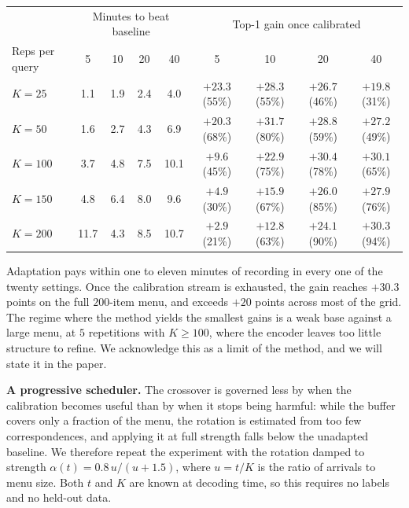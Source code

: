 \documentclass[11pt]{article}
\begin{document}
{\begin{center}
\small\setlength{\tabcolsep}{4pt}
\begin{tabular}{lcccc|cccc}
\hline
& \multicolumn{4}{c|}{Minutes to beat baseline} & \multicolumn{4}{c}{Top-1 gain once calibrated} \\
Reps per query & 5 & 10 & 20 & 40 & 5 & 10 & 20 & 40 \\
\hline
$K=25$  & 1.1 & 1.9 & 2.4 & 4.0  & $+23.3$ (55\%) & $+28.3$ (55\%) & $+26.7$ (46\%) & $+19.8$ (31\%) \\
$K=50$  & 1.6 & 2.7 & 4.3 & 6.9  & $+20.3$ (68\%) & $+31.7$ (80\%) & $+28.8$ (59\%) & $+27.2$ (49\%) \\
$K=100$ & 3.7 & 4.8 & 7.5 & 10.1 & $+9.6$ (45\%)  & $+22.9$ (75\%) & $+30.4$ (78\%) & $+30.1$ (65\%) \\
$K=150$ & 4.8 & 6.4 & 8.0 & 9.6  & $+4.9$ (30\%)  & $+15.9$ (67\%) & $+26.0$ (85\%) & $+27.9$ (76\%) \\
$K=200$ & 11.7 & 4.3 & 8.5 & 10.7 & $+2.9$ (21\%) & $+12.8$ (63\%) & $+24.1$ (90\%) & $+30.3$ (94\%) \\
\hline
\end{tabular}
\end{center}

Adaptation pays within one to eleven minutes of recording in every one of the twenty settings. Once the calibration stream is exhausted, the gain reaches $+30.3$ points on the full $200$-item menu, and exceeds $+20$ points across most of the grid. The regime where the method yields the smallest gains is a weak base against a large menu, at $5$ repetitions with $K \geq 100$, where the encoder leaves too little structure to refine. We acknowledge this as a limit of the method, and we will state it in the paper.

\textbf{A progressive scheduler.} The crossover is governed less by when the calibration becomes useful than by when it stops being harmful: while the buffer covers only a fraction of the menu, the rotation is estimated from too few correspondences, and applying it at full strength falls below the unadapted baseline. We therefore repeat the experiment with the rotation damped to strength $\alpha(t) = 0.8\,u/(u+1.5)$, where $u = t/K$ is the ratio of arrivals to menu size. Both $t$ and $K$ are known at decoding time, so this requires no labels and no held-out data.

}
\end{document}
